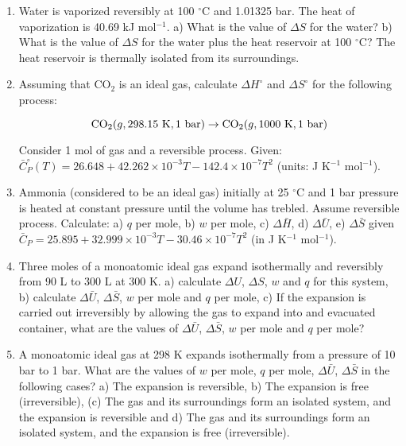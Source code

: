 \begin{enumerate}

\item Water is vaporized reversibly at 100 $^\circ$C and 1.01325 bar. The heat of vaporization is 40.69 kJ mol$^{-1}$. a) What is the value of $\Delta S$ for the water? b) What is the value of $\Delta S$ for the water plus the heat reservoir at 100 $^\circ$C? The heat reservoir is thermally isolated from its surroundings.


\item Assuming that CO$_2$ is an ideal gas, calculate $\Delta H^\circ$ and $\Delta S^\circ$ for the following process:

$$\textnormal{CO}_2(g, 298.15\textnormal{ K}, 1\textnormal{ bar}) \rightarrow \textnormal{CO}_2(g, 1000\textnormal{ K}, 1\textnormal{ bar})$$

Consider 1 mol of gas and a reversible process. Given: $\bar{C}^{\circ}_P(T) = 26.648 + 42.262 \times 10^{-3}T - 142.4 \times 10^{-7}T^2$ (units: J K$^{-1}$ mol$^{-1}$).


\item Ammonia (considered to be an ideal gas) initially at 25 $^\circ$C and 1 bar pressure is heated at constant pressure until the volume has trebled. Assume reversible process. Calculate: a) $q$ per mole, b) $w$ per mole, c) $\Delta\bar{H}$, d) $\Delta\bar{U}$, e) $\Delta\bar{S}$ given $\bar{C}_P = 25.895 + 32.999\times 10^{-3}T - 30.46\times 10^{-7}T^2$ (in J K$^{-1}$ mol$^{-1}$).


\item Three moles of a monoatomic ideal gas expand isothermally and reversibly from 90 L to 300 L at 300 K. a) calculate $\Delta U$, $\Delta S$, $w$ and $q$ for this system, b) calculate $\Delta\bar{U}$, $\Delta\bar{S}$, $w$ per mole and $q$ per mole, c) If the expansion is carried out irreversibly by allowing the gas to expand into and evacuated container, what are the values of $\Delta\bar{U}$, $\Delta\bar{S}$, $w$ per mole and $q$ per mole?


\item A monoatomic ideal gas at 298 K expands isothermally from a pressure of 10 bar to 1 bar. What are the values of $w$ per mole, $q$ per mole, $\Delta\bar{U}$, $\Delta\bar{S}$ in the following cases? a) The expansion is reversible, b) The expansion is free (irreversible), (c) The gas and its surroundings form an isolated system, and the expansion is reversible and d) The gas and its surroundings form an isolated system, and the expansion is free (irreversible).


\end{enumerate}
